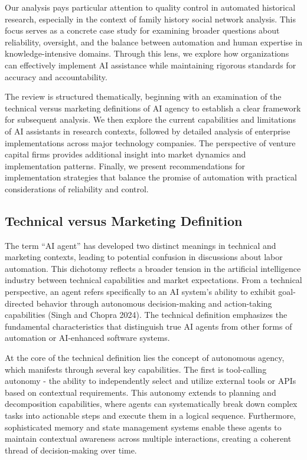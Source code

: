 \documentclass[
]{article}
\begin{document}
Our analysis pays particular attention to quality control in automated
historical research, especially in the context of family history social
network analysis. This focus serves as a concrete case study for
examining broader questions about reliability, oversight, and the
balance between automation and human expertise in knowledge-intensive
domains. Through this lens, we explore how organizations can effectively
implement AI assistance while maintaining rigorous standards for
accuracy and accountability.

The review is structured thematically, beginning with an examination of
the technical versus marketing definitions of AI agency to establish a
clear framework for subsequent analysis. We then explore the current
capabilities and limitations of AI assistants in research contexts,
followed by detailed analysis of enterprise implementations across major
technology companies. The perspective of venture capital firms provides
additional insight into market dynamics and implementation patterns.
Finally, we present recommendations for implementation strategies that
balance the promise of automation with practical considerations of
reliability and control.

\subsection{Technical versus Marketing
Definition}\label{technical-versus-marketing-definition}

The term ``AI agent'' has developed two distinct meanings in technical
and marketing contexts, leading to potential confusion in discussions
about labor automation. This dichotomy reflects a broader tension in the
artificial intelligence industry between technical capabilities and
market expectations. From a technical perspective, an agent refers
specifically to an AI system's ability to exhibit goal-directed behavior
through autonomous decision-making and action-taking capabilities (Singh
and Chopra 2024). The technical definition emphasizes the fundamental
characteristics that distinguish true AI agents from other forms of
automation or AI-enhanced software systems.

At the core of the technical definition lies the concept of autonomous
agency, which manifests through several key capabilities. The first is
tool-calling autonomy - the ability to independently select and utilize
external tools or APIs based on contextual requirements. This autonomy
extends to planning and decomposition capabilities, where agents can
systematically break down complex tasks into actionable steps and
execute them in a logical sequence. Furthermore, sophisticated memory
and state management systems enable these agents to maintain contextual
awareness across multiple interactions, creating a coherent thread of
decision-making over time.
\end{document}
